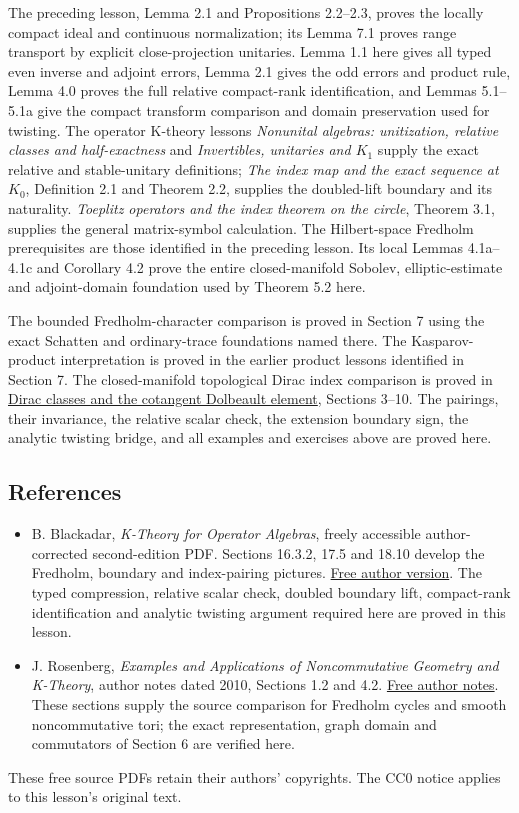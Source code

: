 \documentclass[
  11pt,
]{article}
\begin{document}
The preceding lesson, Lemma 2.1 and Propositions 2.2--2.3, proves the
locally compact ideal and continuous normalization; its Lemma 7.1 proves
range transport by explicit close-projection unitaries. Lemma 1.1 here
gives all typed even inverse and adjoint errors, Lemma 2.1 gives the odd
errors and product rule, Lemma 4.0 proves the full relative compact-rank
identification, and Lemmas 5.1--5.1a give the compact transform
comparison and domain preservation used for twisting. The operator
K-theory lessons \emph{Nonunital algebras: unitization, relative classes
and half-exactness} and \emph{Invertibles, unitaries and \(K_1\)} supply
the exact relative and stable-unitary definitions; \emph{The index map
and the exact sequence at \(K_0\)}, Definition 2.1 and Theorem 2.2,
supplies the doubled-lift boundary and its naturality. \emph{Toeplitz
operators and the index theorem on the circle}, Theorem 3.1, supplies
the general matrix-symbol calculation. The Hilbert-space Fredholm
prerequisites are those identified in the preceding lesson. Its local
Lemmas 4.1a--4.1c and Corollary 4.2 prove the entire closed-manifold
Sobolev, elliptic-estimate and adjoint-domain foundation used by Theorem
5.2 here.

The bounded Fredholm-character comparison is proved in Section 7 using
the exact Schatten and ordinary-trace foundations named there. The
Kasparov-product interpretation is proved in the earlier product lessons
identified in Section 7. The closed-manifold topological Dirac index
comparison is proved in \href{KT-KK-15.html}{Dirac classes and the
cotangent Dolbeault element}, Sections 3--10. The pairings, their
invariance, the relative scalar check, the extension boundary sign, the
analytic twisting bridge, and all examples and exercises above are
proved here.

\subsection{References}\label{references}

\begin{itemize}
\item
  B. Blackadar, \emph{K-Theory for Operator Algebras}, freely accessible
  author-corrected second-edition PDF. Sections 16.3.2, 17.5 and 18.10
  develop the Fredholm, boundary and index-pairing pictures.
  \href{https://www.bruceblackadar.com/Mathematics/book6.pdf}{Free
  author version}. The typed compression, relative scalar check, doubled
  boundary lift, compact-rank identification and analytic twisting
  argument required here are proved in this lesson.
\item
  J. Rosenberg, \emph{Examples and Applications of Noncommutative
  Geometry and K-Theory}, author notes dated 2010, Sections 1.2 and 4.2.
  \href{https://math.umd.edu/~jmr/BuenosAires/NCGexamples.pdf}{Free
  author notes}. These sections supply the source comparison for
  Fredholm cycles and smooth noncommutative tori; the exact
  representation, graph domain and commutators of Section 6 are verified
  here.
\end{itemize}

These free source PDFs retain their authors' copyrights. The CC0 notice
applies to this lesson's original text.
\end{document}
